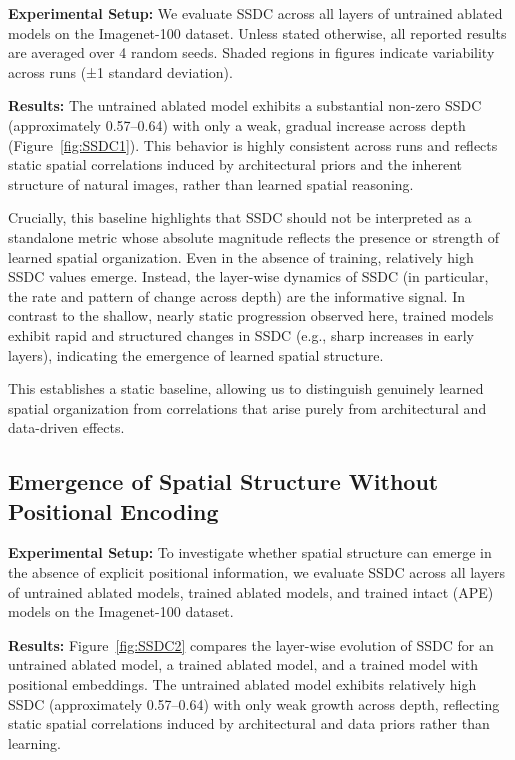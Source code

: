 \documentclass{article}
\begin{document}
    \textbf{Experimental Setup:} We evaluate SSDC across all layers of untrained ablated models on the Imagenet-100 dataset. Unless stated otherwise, all reported results are averaged over 4 random seeds. Shaded regions in figures indicate variability across runs (±1 standard deviation).

    \textbf{Results:}
    The untrained ablated model exhibits a substantial non-zero SSDC (approximately 0.57–0.64) with only a weak, gradual increase across depth (Figure~\ref{fig:SSDC1}). This behavior is highly consistent across runs and reflects static spatial correlations induced by architectural priors and the inherent structure of natural images, rather than learned spatial reasoning.

    Crucially, this baseline highlights that SSDC should not be interpreted as a standalone metric whose absolute magnitude reflects the presence or strength of learned spatial organization. Even in the absence of training, relatively high SSDC values emerge. Instead, the layer-wise dynamics of SSDC (in particular, the rate and pattern of change across depth) are the informative signal. In contrast to the shallow, nearly static progression observed here, trained models exhibit rapid and structured changes in SSDC (e.g., sharp increases in early layers), indicating the emergence of learned spatial structure.

    This establishes a static baseline, allowing us to distinguish genuinely learned spatial organization from correlations that arise purely from architectural and data-driven effects.
  

    
  \subsection{Emergence of Spatial Structure Without Positional Encoding}
    \textbf{Experimental Setup:} To investigate whether spatial structure can emerge in the absence of explicit positional information, we evaluate SSDC across all layers of untrained ablated models, trained ablated models, and trained intact (APE) models on the Imagenet-100 dataset.

    \textbf{Results:}
    Figure~\ref{fig:SSDC2} compares the layer-wise evolution of SSDC for an untrained ablated model, a trained ablated model, and a trained model with positional embeddings. The untrained ablated model exhibits relatively high SSDC (approximately 0.57–0.64) with only weak growth across depth, reflecting static spatial correlations induced by architectural and data priors rather than learning.
\end{document}

